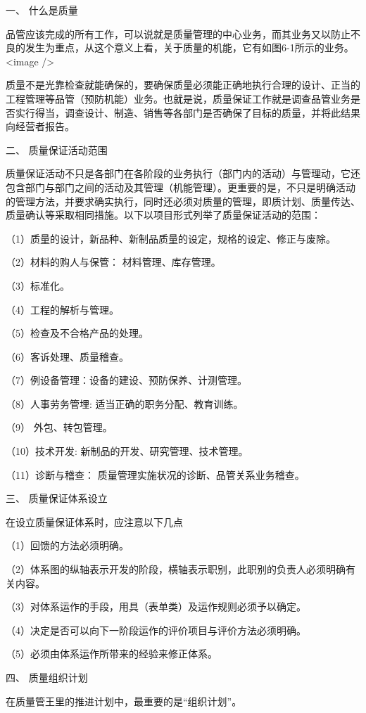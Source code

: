 一、 什么是质量

    品管应该完成的所有工作，可以说就是质量管理的中心业务，而其业务又以防止不良的发生为重点，从这个意义上看，关于质量的机能，它有如图6-1所示的业务。<image />

质量不是光靠检查就能确保的，要确保质量必须能正确地执行合理的设计、正当的工程管理等品管（预防机能）业务。也就是说，质量保证工作就是调查品管业务是否实行得当，调查设计、制造、销售等各部门是否确保了目标的质量，并将此结果向经营者报告。

二、 质量保证活动范围

  质量保证活动不只是各部门在各阶段的业务执行（部门内的活动）与管理动，它还包含部门与部门之间的活动及其管理（机能管理）。更重要的是，不只是明确活动的管理方法，并要求确实执行，同时还必须对质量的管理，即质计划、质量传达、质量确认等采取相同措施。以下以项目形式列举了质量保证活动的范围：

    （1）质量的设计，新品种、新制品质量的设定，规格的设定、修正与废除。

    （2）材料的购人与保管： 材料管理、库存管理。

    （3）标准化。

    （4）工程的解析与管理。

    （5）检查及不合格产品的处理。

    （6）客诉处理、质量稽查。

    （7）例设备管理：设备的建设、预防保养、计测管理。

    （8）人事劳务管埋: 适当正确的职务分配、教育训练。

    （9） 外包、转包管理。

    （10）技术开发: 新制品的开发、研究管理、技术管理。

    （11）诊断与稽查： 质量管理实施状况的诊断、品管关系业务稽查。

    三、 质量保证体系设立

    在设立质量保证体系时，应注意以下几点

    （1）回馈的方法必须明确。

    （2）体系图的纵轴表示开发的阶段，横轴表示职别，此职别的负责人必须明确有关内容。

    （3）对体系运作的手段，用具（表单类）及运作规则必须予以确定。

    （4）决定是否可以向下一阶段运作的评价项目与评价方法必须明确。

    （5）必须由体系运作所带来的经验来修正体系。

    四、 质量组织计划

    在质量管王里的推进计划中，最重要的是“组织计划”。

